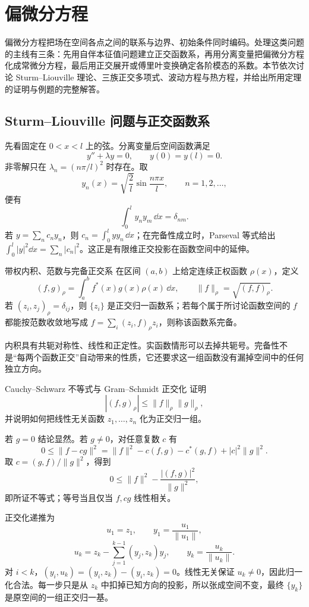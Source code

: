 
\section{偏微分方程}

偏微分方程把场在空间各点之间的联系与边界、初始条件同时编码。处理这类问题的主线有三条：先用自伴本征值问题建立正交函数系，再用分离变量把偏微分方程化成常微分方程，最后用正交展开或傅里叶变换确定各阶模态的系数。本节依次讨论 Sturm--Liouville 理论、三族正交多项式、波动方程与热方程，并给出所用定理的证明与例题的完整解答。

\subsection{Sturm--Liouville 问题与正交函数系}

先看固定在 $0<x<l$ 上的弦。分离变量后空间函数满足
\[
 y''+\lambda y=0,\qquad y(0)=y(l)=0.
\]
非零解只在 $\lambda_n=(n\pi/l)^2$ 时存在。取
\[
 y_n(x)=\sqrt{\frac2l}\sin\frac{n\pi x}{l},\qquad n=1,2,\ldots,
\]
便有
\[
 \int_0^l y_ny_m\,\dd x=\delta_{nm}.
\]
若 $y=\sum_n c_ny_n$，则 $c_n=\int_0^l yy_n\,\dd x$；在完备性成立时，Parseval 等式给出
$\int_0^l|y|^2\dd x=\sum_n|c_n|^2$。这正是有限维正交投影在函数空间中的延伸。

\begin{advdefinition}{带权内积、范数与完备正交系}\label{advA3:def:weighted-inner-product}
在区间 $(a,b)$ 上给定连续正权函数 $\rho(x)$，定义
\[
 (f,g)_\rho=\int_a^b f^*(x)g(x)\rho(x)\,\dd x,
 \qquad \|f\|_\rho=\sqrt{(f,f)_\rho}.
\]
若 $(z_i,z_j)_\rho=\delta_{ij}$，则 $\{z_i\}$ 是正交归一函数系；若每个属于所讨论函数空间的 $f$ 都能按范数收敛地写成 $f=\sum_i(z_i,f)_\rho z_i$，则称该函数系完备。
\end{advdefinition}

内积具有共轭对称性、线性和正定性。实函数情形可以去掉共轭号。完备性不是“每两个函数正交”自动带来的性质，它还要求这一组函数没有漏掉空间中的任何独立方向。

\begin{advexamplebox}{Cauchy--Schwarz 不等式与 Gram--Schmidt 正交化}\label{advA3:ex:cauchy-schmidt}
证明
\[
 |(f,g)_\rho|\le \|f\|_\rho\|g\|_\rho,
\]
并说明如何把线性无关函数 $z_1,\ldots,z_n$ 化为正交归一组。

\AQOrthogonal
\end{advexamplebox}
\begin{advsolution}
\AAOrthogonal

若 $g=0$ 结论显然。若 $g\ne0$，对任意复数 $c$ 有
\[
 0\le\|f-cg\|^2
 =\|f\|^2-c(f,g)-c^*(g,f)+|c|^2\|g\|^2.
\]
取 $c=(g,f)/\|g\|^2$，得到
\[
 0\le\|f\|^2-\frac{|(f,g)|^2}{\|g\|^2},
\]
即所证不等式；等号当且仅当 $f,cg$ 线性相关。

正交化递推为
\[
 u_1=z_1,\qquad y_1=\frac{u_1}{\|u_1\|},
\]
\[
 u_k=z_k-\sum_{j=1}^{k-1}(y_j,z_k)y_j,\qquad
 y_k=\frac{u_k}{\|u_k\|}.
\]
对 $i<k$，$(y_i,u_k)=(y_i,z_k)-(y_i,z_k)=0$。线性无关保证 $u_k\ne0$，因此归一化合法。每一步只是从 $z_k$ 中扣掉已知方向的投影，所以张成空间不变，最终 $\{y_k\}$ 是原空间的一组正交归一基。
\end{advsolution}


